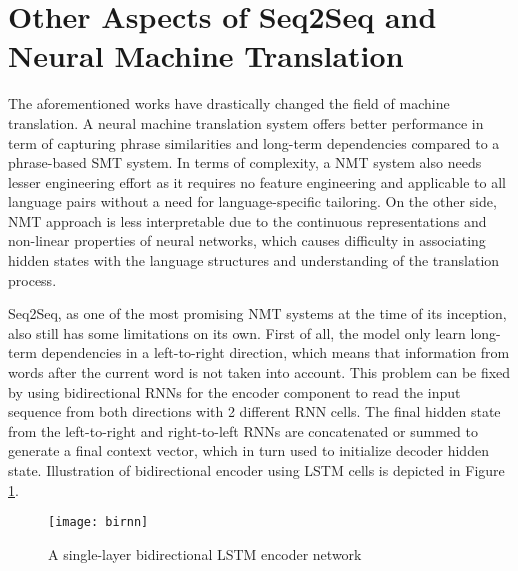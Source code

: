 \documentclass[12pt]{extarticle}
\begin{document}
\section*{Other Aspects of Seq2Seq and Neural Machine Translation} %
The aforementioned works \citep{kalchbrenner-blunsom-2013-recurrent-continuous,cho-etal-2014-learning, Sutskever:2014:SSL:2969033.2969173} have drastically changed the field of machine translation. A neural machine translation system offers better performance in term of capturing phrase similarities and long-term dependencies compared to a phrase-based SMT system. In terms of complexity, a NMT system also needs lesser engineering effort as it requires no feature engineering and applicable to all language pairs without a need for language-specific tailoring. On the other side, NMT approach is less interpretable due to the continuous representations and non-linear properties of neural networks, which causes difficulty in associating hidden states with the language structures and understanding of the translation process.

Seq2Seq, as one of the most promising NMT systems at the time of its inception, also still has some limitations on its own. First of all, the model only learn long-term dependencies in a left-to-right direction, which means that information from words after the current word is not taken into account. This problem can be fixed by using bidirectional RNNs \citep{Schuster:1997:BRN:2198065.2205129} for the encoder component to read the input sequence from both directions with 2 different RNN cells. The final hidden state from the left-to-right and right-to-left RNNs are concatenated or summed to generate a final context vector, which in turn used to initialize decoder hidden state. Illustration of bidirectional encoder using LSTM cells is depicted in Figure \ref{fig:birnn}.

\begin{figure}[ht]
\centering
\texttt{[image: birnn]}
\caption{A single-layer bidirectional LSTM encoder network}
\label{fig:birnn}
\end{figure}
\end{document}
